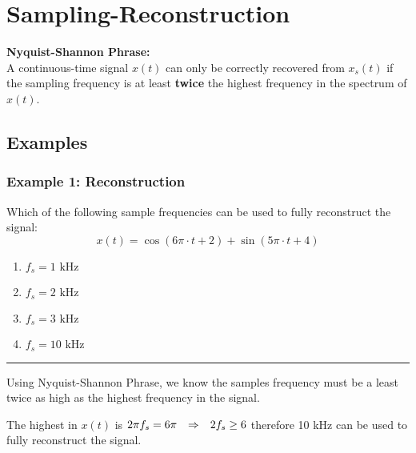 \section{Sampling-Reconstruction}
\textbf{Nyquist-Shannon Phrase:}\\
A continuous-time signal $x(t)$ can only be correctly recovered from $x_{s}(t)$ if the sampling frequency is at least \textbf{twice} the highest frequency in the spectrum of $x(t)$.

\subsection{Examples}
\subsubsection{Example 1: Reconstruction}
Which of the following sample frequencies can be used to fully reconstruct the signal:
$$x(t)=\cos(6\pi\cdot t+2)+\sin(5\pi\cdot t+4)$$
\begin{enumerate}
  \item $f_s=1\text{ kHz}$
  \item $f_s=2\text{ kHz}$
  \item $f_s=3\text{ kHz}$
  \item $f_s=10\text{ kHz}$
\end{enumerate}

\rule{\textwidth}{0.5pt}

Using Nyquist-Shannon Phrase, we know the samples frequency must be a least twice as high as the highest frequency in the signal.

The highest in $x(t)$ is $2\pi f_s=6\pi{\quad\Rightarrow\quad} 2f_s\geq 6$ therefore 10 kHz can be used to fully reconstruct the signal.
